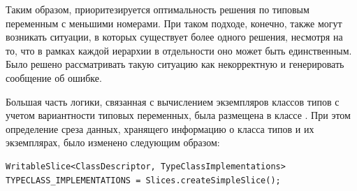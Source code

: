 Таким образом, приоритезируется оптимальность решения по типовым переменным с меньшими номерами. При таком подходе, конечно, также могут возникать ситуации, в которых существует более одного решения, несмотря на то, что в рамках каждой иерархии в отдельности оно может быть единственным. Было решено рассматривать такую ситуацию как некорректную и генерировать сообщение об ошибке. 

Большая часть логики, связанная с вычислением экземпляров классов типов с учетом вариантности типовых переменных, была размещена в классе . При этом определение среза данных, хранящего информацию о класса типов и их экземплярах, было изменено следующим образом:
\begin{lstlisting}[style={wo_caption}]
WritableSlice<ClassDescriptor, TypeClassImplementations> 
TYPECLASS_IMPLEMENTATIONS = Slices.createSimpleSlice();
\end{lstlisting}